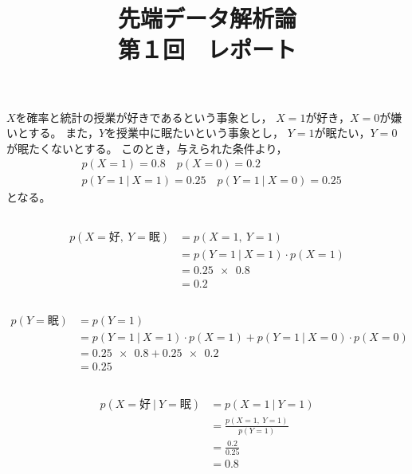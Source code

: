 \documentclass[dvipdfmx, fleqn, titlepage]{jsarticle}
\title{
	先端データ解析論 \\
	第１回　レポート
	}
\begin{document}
\maketitle

\section{}

$X$を確率と統計の授業が好きであるという事象とし，
$X = 1$が好き，$X = 0$が嫌いとする。
また，$Y$を授業中に眠たいという事象とし，
$Y = 1$が眠たい，$Y = 0$が眠たくないとする。
このとき，与えられた条件より，
\begin{align*}
    & p(X=1) = 0.8 \quad p(X=0) = 0.2 \\
    & p(Y=1\ |\ X=1) = 0.25 \quad p(Y=1\ |\ X=0) = 0.25
\end{align*}
となる。


\subsection{}
\begin{align*}
    p(X=\text{好},\ Y=\text{眠})
    & = p(X=1,\ Y=1) \\
    & = p(Y=1\ |\ X=1) \cdot p(X=1) \\
    & = \num{0.25 x 0.8} \\
    & = 0.2
\end{align*}


\subsection{}
\begin{align*}
	p(Y=\text{眠})
	& = p(Y=1) \\
	& = p(Y=1\ |\ X=1) \cdot p(X=1) + p(Y=1\ |\ X=0) \cdot p(X=0) \\
	& = \num{0.25 x 0.8} + \num{0.25 x 0.2} \\
	& = 0.25
\end{align*}


\subsection{}
\begin{align*}
    p(X=\text{好}\ |\ Y=\text{眠})
    & = p(X=1\ |\ Y=1) \\
    & = \frac{p(X=1,\ Y=1)}{p(Y=1)} \\
    & = \frac{0.2}{0.25} \\
    & = 0.8
\end{align*}
\end{document}
